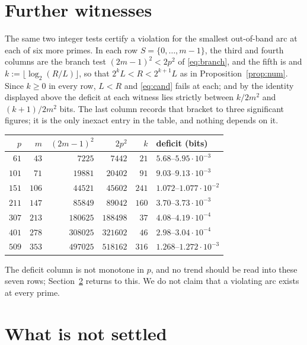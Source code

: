 \documentclass[11pt]{amsart}
\theoremstyle{remark}
\begin{document}
\section{Further witnesses}\label{sec:table}

The same two integer tests certify a violation for the smallest out-of-band
arc at each of six more primes.  In each row $S=\{0,\dots,m-1\}$, the third
and fourth columns are the branch test $(2m-1)^2<2p^2$ of \eqref{eq:branch}, and the fifth is
and $k:=\lfloor\log_2(R/L)\rfloor$, so that $2^kL<R<2^{k+1}L$ as in
Proposition~\ref{prop:num}.  Since $k\ge0$ in every row, $L<R$ and
\eqref{eq:cand} fails at each; and by the identity displayed above the deficit
at each witness lies strictly between $k/2m^2$ and $(k+1)/2m^2$ bits.  The
last column records that bracket to three significant figures; it is the only
inexact entry in the table, and nothing depends on it.

\begin{center}
\small
\setlength{\tabcolsep}{4pt}
\begin{tabular}{rrrrrl}
$p$ & $m$ & $(2m-1)^2$ & $2p^2$ & $k$
 & deficit (bits)\\
\hline
$61$  & $43$  & $7225$   & $7442$   & $21$
 & $5.68$--$5.95\cdot10^{-3}$\\
$101$ & $71$  & $19881$  & $20402$  & $91$
 & $9.03$--$9.13\cdot10^{-3}$\\
$151$ & $106$ & $44521$  & $45602$  & $241$
 & $1.072$--$1.077\cdot10^{-2}$\\
$211$ & $147$ & $85849$  & $89042$  & $160$
 & $3.70$--$3.73\cdot10^{-3}$\\
$307$ & $213$ & $180625$ & $188498$ & $37$
 & $4.08$--$4.19\cdot10^{-4}$\\
$401$ & $278$ & $308025$ & $321602$ & $46$
 & $2.98$--$3.04\cdot10^{-4}$\\
$509$ & $353$ & $497025$ & $518162$ & $316$
 & $1.268$--$1.272\cdot10^{-3}$\\
\end{tabular}
\end{center}

\noindent
The deficit column is not monotone in $p$, and no trend should be read into
these seven rows; Section~\ref{sec:scope} returns to this.  We do not claim
that a violating arc exists at every prime.

\section{What is not settled}\label{sec:scope}
\end{document}
